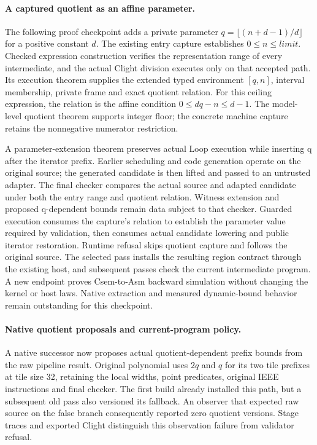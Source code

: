 \paragraph{A captured quotient as an affine parameter.}
The following proof checkpoint adds a private parameter
$q=\lfloor(n+d-1)/d\rfloor$ for a positive constant $d$.
The existing entry capture establishes $0\leq n\leq\mathit{limit}$.
Checked expression construction verifies the representation range of every
intermediate, and the actual Clight division executes only on that accepted
path. Its execution theorem supplies the extended typed environment $[q,n]$,
interval membership, private frame and exact quotient relation.
For this ceiling expression, the relation is the affine condition
$0\leq dq-n\leq d-1$. The model-level quotient theorem supports integer floor;
the concrete machine capture retains the nonnegative numerator restriction.

A parameter-extension theorem preserves actual Loop execution while inserting
q after the iterator prefix. Earlier scheduling and code generation operate on
the original source; the generated candidate is then lifted and passed to an
untrusted adapter. The final checker compares the actual source and adapted
candidate under both the entry range and quotient relation. Witness extension
and proposed q-dependent bounds remain data subject to that checker.
Guarded execution consumes the capture's relation to establish the parameter
value required by validation, then consumes actual candidate lowering and
public iterator restoration. Runtime refusal skips quotient capture and follows
the original source. The selected pass installs the resulting region contract
through the existing host, and subsequent passes check the current intermediate
program. A new endpoint proves Csem-to-Asm backward simulation without changing
the kernel or host laws. Native extraction and measured dynamic-bound behavior
remain outstanding for this checkpoint.

\paragraph{Native quotient proposals and current-program policy.}
A native successor now proposes actual quotient-dependent prefix bounds from
the raw pipeline result. Original polynomial uses $2q$ and $q$ for its two tile
prefixes at tile size 32, retaining the local widths, point predicates, original
IEEE instructions and final checker. The first build already installed this
path, but a subsequent old pass also versioned its fallback. An observer that
expected raw source on the false branch consequently reported zero quotient
versions. Stage traces and exported Clight distinguish this observation failure
from validator refusal.


